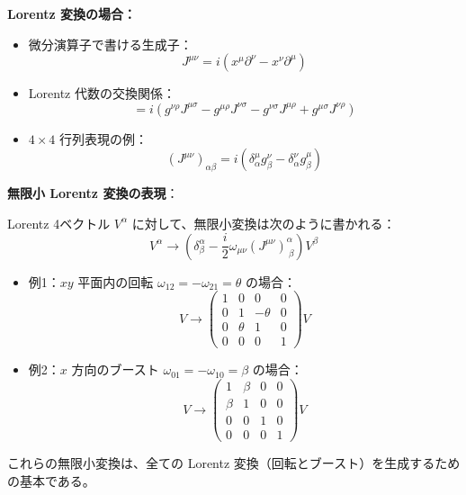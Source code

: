 \documentclass[a4paper,12pt]{article}
\begin{document}
\vspace{1em}
\textbf{Lorentz 変換の場合：}

\begin{itemize}
  \item 微分演算子で書ける生成子：
  \begin{equation*}
  J^{\mu\nu} = i(x^\mu \partial^\nu - x^\nu \partial^\mu) \tag{3.16}
  \end{equation*}
  \item Lorentz 代数の交換関係：
  \begin{equation*}
  [J^{\mu\nu}, J^{\rho\sigma}] = i(g^{\nu\rho} J^{\mu\sigma} - g^{\mu\rho} J^{\nu\sigma} - g^{\nu\sigma} J^{\mu\rho} + g^{\mu\sigma} J^{\nu\rho}) \tag{3.17}
  \end{equation*}
  \item $4 \times 4$ 行列表現の例：
  \begin{equation*}
  (J^{\mu\nu})_{\alpha\beta} = i(\delta^\mu_\alpha g^\nu_\beta - \delta^\nu_\alpha g^\mu_\beta) \tag{3.18}
  \end{equation*}
\end{itemize}

\vspace{1em}
\textbf{無限小 Lorentz 変換の表現}：

Lorentz 4ベクトル $V^\alpha$ に対して、無限小変換は次のように書かれる：
\begin{equation*}
V^\alpha \rightarrow \left( \delta^\alpha_\beta - \frac{i}{2} \omega_{\mu\nu}(J^{\mu\nu})^\alpha_{\ \beta} \right)V^\beta \tag{3.19}
\end{equation*}

\begin{itemize}
  \item 例1：$xy$ 平面内の回転 $\omega_{12} = -\omega_{21} = \theta$ の場合：
  \begin{equation*}
  V \rightarrow 
  \begin{pmatrix}
  1 & 0 & 0 & 0 \\
  0 & 1 & -\theta & 0 \\
  0 & \theta & 1 & 0 \\
  0 & 0 & 0 & 1
  \end{pmatrix}
  V \tag{3.20}
  \end{equation*}

  \item 例2：$x$ 方向のブースト $\omega_{01} = -\omega_{10} = \beta$ の場合：
  \begin{equation*}
  V \rightarrow 
  \begin{pmatrix}
  1 & \beta & 0 & 0 \\
  \beta & 1 & 0 & 0 \\
  0 & 0 & 1 & 0 \\
  0 & 0 & 0 & 1
  \end{pmatrix}
  V \tag{3.21}
  \end{equation*}
\end{itemize}

これらの無限小変換は、全ての Lorentz 変換（回転とブースト）を生成するための基本である。
\end{document}
